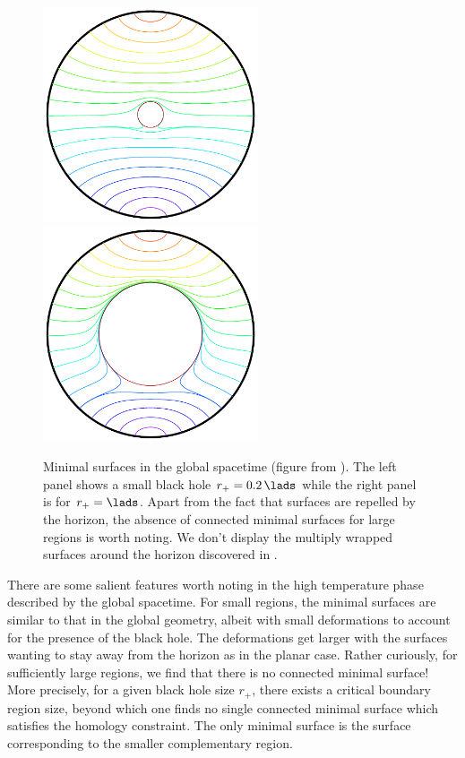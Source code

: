 \documentclass[12pt,openany]{book}
\begin{document}
\begin{figure}[htbp]
\begin{center}
\includegraphics[width=2.5in]{figures/SurfacesAdS5-1}
\hspace{1cm}
\includegraphics[width=2.5in]{figures/SurfacesAdS5-2}
\end{center}
\caption{Minimal surfaces in the global  spacetime (figure from \cite{Hubeny:2013gta}). The left panel shows a small black hole $r_+ = 0.2\,\lads$ while the right panel is for $r_+ = \lads$. Apart from the fact that surfaces are repelled by the horizon, the absence of connected minimal surfaces for large regions is worth noting. We don't display the multiply wrapped surfaces around the horizon discovered in \cite{Hubeny:2013gta}.
}
\label{f:sads5}
\end{figure}
%

There are some salient features  worth noting in the high temperature phase described by the global  spacetime. For small regions, the minimal surfaces are similar to that in the global  geometry, albeit with small deformations to account for the presence of the black hole. The deformations get larger  with the surfaces wanting to stay away from the horizon as in the planar case. Rather curiously, for sufficiently large regions, we find that there is no connected minimal surface! More precisely, for a given black hole size $r_+$, there exists a critical boundary region size, beyond which one finds no single connected minimal surface which satisfies the homology constraint. The only minimal surface is the surface corresponding to the smaller complementary region.
\end{document}
